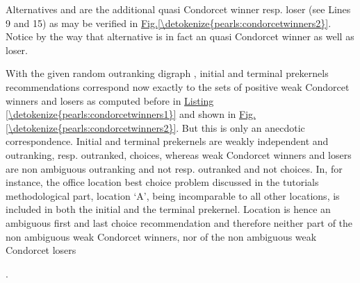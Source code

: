 \documentclass[a4paper,12pt,english]{sphinxhowto}
\begin{document}
\sphinxAtStartPar
Alternatives  and  are the additional quasi Condorcet winner resp. loser (see Lines 9 and 15) as may be verified in \hyperref[\detokenize{pearls:condorcetwinners2}]{Fig.\@ \ref{\detokenize{pearls:condorcetwinners2}}}. Notice by the way that alternative  is in fact an  quasi Condorcet winner as well as loser.

\sphinxAtStartPar
With the given random outranking digraph , initial and terminal prekernels recommendations correspond now exactly to the sets of positive weak Condorcet winners and losers as computed before in \hyperref[\detokenize{pearls:condorcetwinners1}]{Listing \ref{\detokenize{pearls:condorcetwinners1}}} and shown in \hyperref[\detokenize{pearls:condorcetwinners2}]{Fig.\@ \ref{\detokenize{pearls:condorcetwinners2}}}. But this is only an anecdotic correspondence. Initial and terminal prekernels are weakly independent and  outranking, resp. outranked,  choices, whereas weak Condorcet winners and losers are non ambiguous  outranking and not  resp.  outranked and not  choices. In, for instance, the office location best choice problem discussed in the tutorials methodological part, location ‘A’, being incomparable to all other locations, is included in both the initial and the terminal prekernel. Location  is hence an ambiguous first and last choice recommendation and therefore neither part of the non ambiguous weak Condorcet winners, nor of the non ambiguous weak Condorcet losers %
\begin{footnote}[33]\sphinxAtStartFootnote
{}
%
\end{footnote}.
\end{document}
